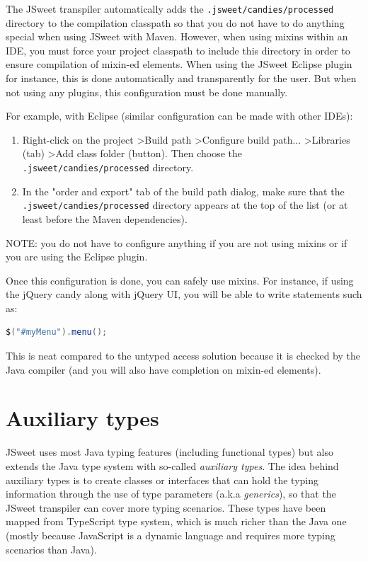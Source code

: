\documentclass[a4paper]{report}
\begin{document}
The JSweet transpiler automatically adds the \texttt{.jsweet/candies/processed} directory to the compilation classpath so that you do not have to do anything special when using JSweet with Maven. However, when using mixins within an IDE, you must force your project classpath to include this directory in order to ensure compilation of mixin-ed elements. When using the JSweet Eclipse plugin for instance, this is done automatically and transparently for the user. But when not using any plugins, this configuration must be done manually.

For example, with Eclipse (similar configuration can be made with other IDEs):

\begin{enumerate}
\item Right-click on the project \textgreater Build path \textgreater Configure build path... \textgreater Libraries (tab) \textgreater Add class folder (button). Then choose the \texttt{.jsweet/candies/processed} directory.
\item In the "order and export" tab of the build path dialog, make sure that the \texttt{.jsweet/candies/processed} directory appears at the top of the list (or at least before the Maven dependencies).
\end{enumerate}

NOTE: you do not have to configure anything if you are not using mixins or if you are using the Eclipse plugin.

Once this configuration is done, you can safely use mixins. For instance, if using the jQuery candy along with jQuery UI, you will be able to write statements such as:

\begin{lstlisting}[language=Java]
$("#myMenu").menu();
\end{lstlisting}

This is neat compared to the untyped access solution because it is checked by the Java compiler (and you will also have completion on mixin-ed elements).

\chapter{Auxiliary types}

JSweet uses most Java typing features (including functional types) but also extends the Java type system with so-called \emph{auxiliary types}. The idea behind auxiliary types is to create classes or interfaces that can hold the typing information through the use of type parameters (a.k.a \emph{generics}), so that the JSweet transpiler can cover more typing scenarios. These types have been mapped from TypeScript type system, which is much richer than the Java one (mostly because JavaScript is a dynamic language and requires more typing scenarios than Java). 
\end{document}
